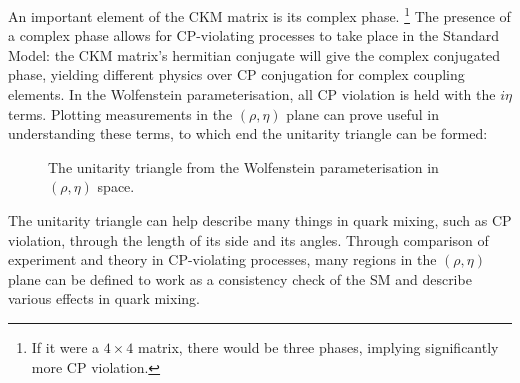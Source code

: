 \documentclass[a4paper,12pt]{article}
\begin{document}
An important element of the CKM matrix is its complex phase.
\hspace{-10pt}\footnote{If it were a $4\times4$ matrix, there would be three phases, implying significantly more CP violation.}
\hspace{-5pt}The presence of a complex phase allows for CP-violating processes to take place in the Standard Model: the CKM matrix's hermitian conjugate will give the complex conjugated phase, yielding different physics over CP conjugation for complex coupling elements. 
In the Wolfenstein parameterisation, all CP violation is held with the $i\eta$ terms. 
Plotting measurements in the $(\rho,\eta)$ plane can prove useful in understanding these terms, to which end the unitarity triangle can be formed:
\begin{figure}[H]
    \centering
    \caption{\label{fig:unitang} The unitarity triangle from the Wolfenstein parameterisation in $(\rho,\eta)$ space.}
\end{figure}
The unitarity triangle can help describe many things in quark mixing, such as CP violation, through the length of its side and its angles. 
Through comparison of experiment and theory in CP-violating processes, many regions in the $(\rho,\eta)$ plane can be defined to work as a consistency check of the SM and describe various effects in quark mixing. 
\end{document}
